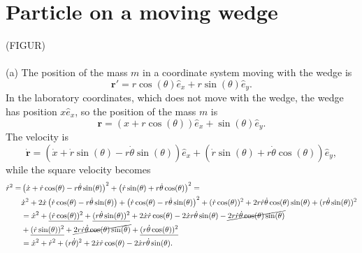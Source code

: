 \documentclass{article}
\begin{document}
    \section{Particle on a moving wedge}
        (FIGUR) \\ \\
        (a) The position of the mass $m$ in a coordinate system moving with the wedge is
        \begin{equation*}
            \mathbf{r}' = r \cos(\theta) \hat e_x + r \sin(\theta) \hat e_y.
        \end{equation*}
        In the laboratory coordinates, which does not move with the wedge, the wedge has position $x \hat e_x$, so the position of the mass $m$ is 
        \begin{equation*}
            \mathbf{r} = (x + r \cos(\theta)) \hat e_x + \sin(\theta) \hat e_y.
        \end{equation*}
        The velocity is
        \begin{equation*}
            \mathbf{\dot r}
            = (\dot x  + \dot r \sin(\theta) - r \dot \theta \sin(\theta)) \hat e_x
            + (\dot r \sin(\theta) + r \dot \theta \cos(\theta)) \hat e_y,
        \end{equation*}
        while the square velocity becomes
        \begin{align*}
            \dot r^2 = & \left(\dot x  + \dot r \cos(\theta) - r \dot \theta \sin(\theta)\right)^2 + \left(\dot r \sin(\theta) + r \dot \theta \cos(\theta)\right)^2 = \\
            & \dot x^2 + 2 \dot x \left(\dot r \cos(\theta) - r \dot \theta \sin(\theta)\right) + \left(\dot r \cos(\theta) - r \dot \theta \sin(\theta)\right)^2 
            + (\dot r \cos(\theta))^2 + 2r \dot r \dot \theta \cos(\theta) \sin(\theta) + (r \dot \theta \sin(\theta))^2\\
            & = \dot x^2 + \underline{(\dot r\cos(\theta))^2} + \underline{(r \dot \theta \sin(\theta))^2} + 2 \dot x \dot r \cos(\theta) - 2 \dot x r \dot \theta \sin(\theta) - \cancel{2 r \dot r \dot \theta \cos(\theta) \sin(\theta)} \\
            & + \underline{(\dot r \sin(\theta))^2} + \cancel{2r \dot r \dot \theta \cos(\theta) \sin(\theta)} + \underline{(r \dot \theta \cos(\theta))^2}\\
            & = \dot x^2 + \dot r^2 + (r \dot \theta)^2+ 2 \dot x \dot r \cos(\theta) - 2 \dot x r \dot \theta \sin(\theta). 
        \end{align*}
\end{document}
